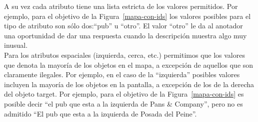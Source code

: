 A su vez cada atributo tiene una lista estricta de los valores permitidos. Por ejemplo, para el objetivo de la Figura~\ref{mapa-con-ids} los valores posibles para el tipo de atributo son s\'olo dos:``pub'' u ``otro''. El valor ``otro'' le da al anotador una oportunidad de dar una respuesta cuando la descripci\'on muestra algo muy inusual.\\

Para los atributos espaciales (izquierda, cerca, etc.) permitimos que los valores que denota la mayor\'{i}a de los objetos en el mapa, a excepci\'on de aquellos que son claramente ilegales. Por ejemplo, en el caso de la ``izquierda'' posibles valores incluyen la mayor\'{i}a de los objetos en la pantalla, a excepci\'on de los de la derecha del objeto target. Por ejemplo, para el objetivo de la Figura~\ref{mapa-con-ids} es posible decir ``el pub que esta a la izquierda de Pans \& Company'', pero no es admitido ``El pub que esta a la izquierda de Posada del Peine''.\\
%







